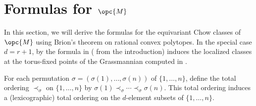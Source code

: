 \documentclass[12pt]{amsart}
\theoremstyle{plain}
\newtheorem{Thm}{Theorem}[section]
\theoremstyle{definition}
\theoremstyle{remark}
\begin{document}
\section{Formulas for $\opc{M}$}\label{formulasection}
In this section, we will derive the formulas for the equivariant Chow classes of $\opc{M}$ using Brion's theorem on rational convex polytopes. In the special case $d=r+1$, by  the formula in  ( from the introduction) induces the localized classes at the torus-fixed points of the Grassmannian computed in \cite[Lemma 5.2]{Fink}.

For each permutation $\sigma=(\sigma(1),\ldots,\sigma(n))$ of $\{1,\ldots,n\}$, define the total ordering $\prec_\sigma$ on $\{1, \ldots, n\}$ by $\sigma(1)\prec_\sigma \cdots\prec_\sigma\sigma(n)$. This total ordering induces a (lexicographic) total ordering on the $d$-element subsets of $\{1, \ldots, n\}$.
\end{document}
